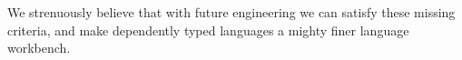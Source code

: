 We strenuously believe that with future engineering we can satisfy these missing criteria, and make dependently typed languages a mighty finer language workbench.


